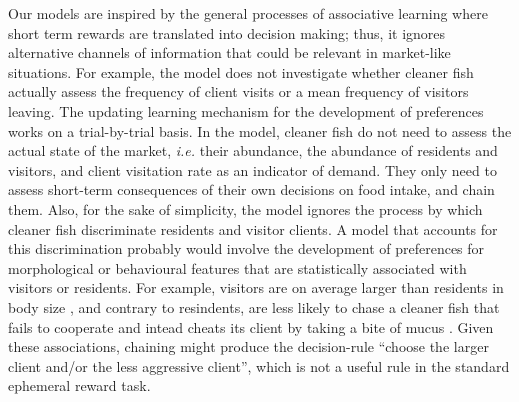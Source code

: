 \documentclass[]{rsos}%
\begin{document}
Our models are inspired by the general processes of associative learning
where short term rewards are translated into decision making; thus, it
ignores alternative channels of information that could be relevant in
market-like situations. For example, the model does not investigate whether
cleaner fish actually assess the frequency of client visits or a mean frequency
of visitors leaving. The updating learning mechanism for the development
of preferences works on a trial-by-trial basis. In the model, cleaner fish
do not need to assess the actual state of the market, \emph{i.e.} their abundance,
the abundance of residents and visitors, and client visitation rate as an
indicator of demand. They only need to assess short-term consequences of their
own decisions on food intake, and chain them. Also, for the sake of
simplicity, the model ignores the process by which cleaner fish discriminate
residents and visitor clients. A model that accounts for this discrimination
probably would involve the development of preferences for morphological or
behavioural features that are statistically associated with visitors
or residents. For example, visitors are on average larger
than residents in body size \citep{bshary_Cleaner_2001}, and contrary to
resindents, are less likely to chase a cleaner fish that fails to cooperate
and intead cheats its client by taking a bite of mucus
\citep{bshary_Asymmetric_2002}. Given these associations, chaining might
produce the decision-rule ``choose the larger client and/or the less aggressive
client'', which is not a useful rule in the standard ephemeral reward task.
\end{document}
